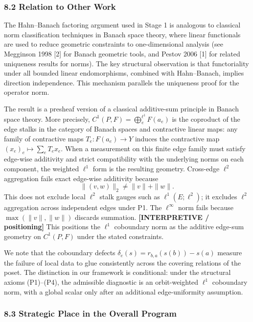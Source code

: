 \documentclass[
  11pt,
]{article}
\begin{document}
\subsubsection{8.2 Relation to Other Work}\label{relation-to-other-work}

The Hahn--Banach factoring argument used in Stage 1 is analogous to classical norm classification techniques in Banach space theory, where linear functionals are used to reduce geometric constraints to one-dimensional analysis (see Megginson 1998 {[}2{]} for Banach geometric tools, and Pestov 2006 {[}1{]} for related uniqueness results for norms). The key structural observation is that functoriality under all bounded linear endomorphisms, combined with Hahn--Banach, implies direction independence. This mechanism parallels the uniqueness proof for the operator norm.

The result is a presheaf version of a classical additive-sum principle in Banach space theory. More precisely, \(C^1(P, F)=\bigoplus_e^{\ell^1}F(a_e)\) is the coproduct of the edge stalks in the category of Banach spaces and contractive linear maps: any family of contractive maps \(T_e:F(a_e)\to Y\) induces the contractive map \((x_e)_e\mapsto\sum_eT_e x_e\). When a measurement on this finite edge family must satisfy edge-wise additivity and strict compatibility with the underlying norms on each component, the weighted \(\ell^1\) form is the resulting geometry. Cross-edge \(\ell^2\) aggregation fails exact edge-wise additivity because
\[
\|(v,w)\|_2\neq \|v\|+\|w\|.
\]
This does not exclude local \(\ell^2\) stalk gauges such as \(\ell^1(E;\ell^2)\); it excludes \(\ell^2\) aggregation across independent edges under P1. The \(\ell^\infty\) norm fails because \(\max(\|v\|, \|w\|)\) discards summation. \textbf{{[}INTERPRETIVE / positioning{]}} This positions the \(\ell^1\) coboundary norm as the additive edge-sum geometry on \(C^1(P,F)\) under the stated constraints.

We note that the coboundary defects \(\delta_e(s) = r_{b,a}(s(b)) - s(a)\) measure the failure of local data to glue consistently across the covering relations of the poset. The distinction in our framework is conditional: under the structural axioms (P1)--(P4), the admissible diagnostic is an orbit-weighted \(\ell^1\) coboundary norm, with a global scalar only after an additional edge-uniformity assumption.

\subsubsection{8.3 Strategic Place in the Overall Program}\label{strategic-place-in-the-overall-program}
\end{document}

